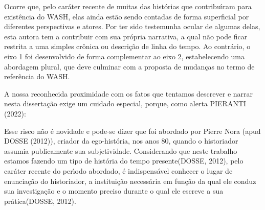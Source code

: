\documentclass[
12pt,		%
openright,	%
twoside,  %
a4paper,			%
chapter=TITLE,		%
english,			%
french,				%
spanish,			%
brazil				%
]{USPSC-classe/USPSC}
\begin{document}
Ocorre que, pelo car\'ater recente de muitas das hist\'orias que contribu\'{\i}ram para exist\^encia do WASH, elas ainda est\~ao sendo contadas de forma superficial por diferentes perspectivas e atores. Por ter sido testemunha ocular de algumas delas, esta autora tem a contribuir com sua pr\'opria narrativa, a qual n\~ao pode ficar restrita a uma simples cr\^onica ou descri\c{c}\~ao de linha do tempo. Ao contr\'ario, o eixo 1 foi desenvolvido de forma complementar ao eixo 2, estabelecendo uma abordagem plural, que deve culminar com a proposta de mudan\c{c}as no termo de refer\^encia do WASH.










A nossa reconhecida proximidade com os fatos que tentamos descrever e narrar nesta disserta\c{c}\~ao exige um cuidado especial, porque, como alerta  PIERANTI (2022):











\noindent\begin{center}\mbox{\centering{}}\end{center}


Esse risco n\~ao \'e novidade e pode-se dizer que foi abordado por Pierre Nora  (apud DOSSE (2012)), criador da ego-hist\'oria, nos anos 80, quando o historiador assumia publicamente sua subjetividade. Considerando que neste trabalho estamos fazendo um tipo de \textquotedbl hist\'oria do tempo presente\textquotedbl   (DOSSE, 2012), pelo car\'ater recente do per\'{\i}odo abordado, \'e indispens\'avel \textquotedbl conhecer o lugar de enuncia\c{c}\~ao do historiador, a institui\c{c}\~ao necess\'aria em fun\c{c}\~ao da qual ele conduz sua investiga\c{c}\~ao e o momento preciso durante o qual ele escreve a sua pr\'atica\textquotedbl   (DOSSE, 2012).
\end{document}
